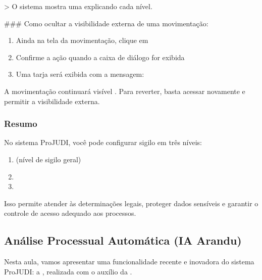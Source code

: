 \documentclass[letterpaper,10pt,brazil]{sphinxmanual}
\begin{document}
\sphinxAtStartPar
\textgreater{} O sistema mostra uma  explicando cada nível.

\sphinxAtStartPar
\#\#\# Como ocultar a visibilidade externa de uma movimentação:
\begin{enumerate}
%
\item {} 
\sphinxAtStartPar
Ainda na tela da movimentação, clique em 

\item {} 
\sphinxAtStartPar
Confirme a ação quando a caixa de diálogo for exibida

\item {} 
\sphinxAtStartPar
Uma tarja será exibida com a mensagem:
\sphinxhyphen{} 

\end{enumerate}

\sphinxAtStartPar
{}
A movimentação continuará visível . Para reverter, basta acessar novamente e permitir a visibilidade externa.


\subsubsection{Resumo}
\label{\detokenize{projud_13_alterarsigilo:resumo}}
\sphinxAtStartPar
No sistema ProJUDI, você pode configurar sigilo em três níveis:
\begin{enumerate}
%
\item {} 
\sphinxAtStartPar
{} (nível de sigilo geral)

\item {} 
\sphinxAtStartPar
{}

\item {} 
\sphinxAtStartPar
{}

\end{enumerate}

\sphinxAtStartPar
Isso permite atender às determinações legais, proteger dados sensíveis e garantir o controle de acesso adequado aos processos.

\sphinxstepscope


\subsection{Análise Processual Automática (IA Arandu)}
\label{\detokenize{projud_14_iaarandu:analise-processual-automatica-ia-arandu}}\label{\detokenize{projud_14_iaarandu::doc}}
\sphinxAtStartPar
Nesta aula, vamos apresentar uma funcionalidade recente e inovadora do sistema ProJUDI: a , realizada com o auxílio da .
\end{document}
